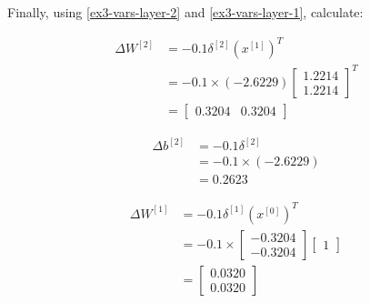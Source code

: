 \documentclass[12pt]{article}
\begin{document}
\begin{enumerate}[leftmargin=\labelsep]
\begin{paracol}{3}
              Finally, using \eqref{ex3-vars-layer-2} and \eqref{ex3-vars-layer-1},
              calculate:

              \begin{footnotesize}
                  $$
                      \begin{aligned}
                          \Delta W^{[2]} & = -0.1 \delta^{[2]} \left(x^{[1]}\right)^T \\
                                         & = -0.1 \times (-2.6229) \begin{bmatrix}
                                                                       1.2214 \\
                                                                       1.2214
                                                                   \end{bmatrix}^T    \\
                                         & = \begin{bmatrix}
                                                 0.3204 & 0.3204
                                             \end{bmatrix}
                      \end{aligned}
                  $$

                  $$
                      \begin{aligned}
                          \Delta b^{[2]} & = -0.1 \delta^{[2]}     \\
                                         & = -0.1 \times (-2.6229) \\
                                         & = 0.2623
                      \end{aligned}
                  $$

                  $$
                      \begin{aligned}
                          \Delta W^{[1]} & = -0.1 \delta^{[1]} \left(x^{[0]}\right)^T \\
                                         & = -0.1 \times \begin{bmatrix}
                                                             -0.3204 \\
                                                             -0.3204
                                                         \end{bmatrix} \begin{bmatrix}
                                                                           1
                                                                       \end{bmatrix} \\
                                         & = \begin{bmatrix}
                                                 0.0320 \\
                                                 0.0320
                                             \end{bmatrix}
                      \end{aligned}
                  $$


\end{footnotesize}
\end{paracol}
\end{enumerate}
\end{document}

